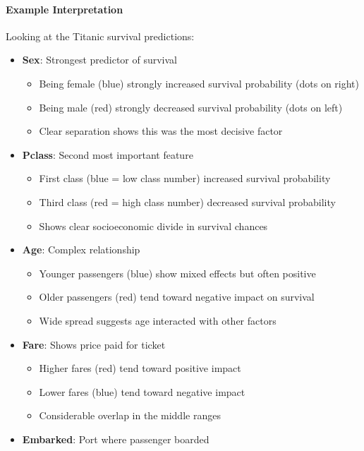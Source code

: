 \documentclass{article}
\begin{document}
\paragraph{Example Interpretation}
Looking at the Titanic survival predictions:
\begin{itemize}
    \item \textbf{Sex}: Strongest predictor of survival
        \begin{itemize}
            \item Being female (blue) strongly increased survival probability (dots on right)
            \item Being male (red) strongly decreased survival probability (dots on left)
            \item Clear separation shows this was the most decisive factor
        \end{itemize}
    \item \textbf{Pclass}: Second most important feature
        \begin{itemize}
            \item First class (blue = low class number) increased survival probability
            \item Third class (red = high class number) decreased survival probability
            \item Shows clear socioeconomic divide in survival chances
        \end{itemize}
    \item \textbf{Age}: Complex relationship
        \begin{itemize}
            \item Younger passengers (blue) show mixed effects but often positive
            \item Older passengers (red) tend toward negative impact on survival
            \item Wide spread suggests age interacted with other factors
        \end{itemize}
    \item \textbf{Fare}: Shows price paid for ticket
        \begin{itemize}
            \item Higher fares (red) tend toward positive impact
            \item Lower fares (blue) tend toward negative impact
            \item Considerable overlap in the middle ranges
        \end{itemize}
    \item \textbf{Embarked}: Port where passenger boarded

\end{itemize}
\end{document}
